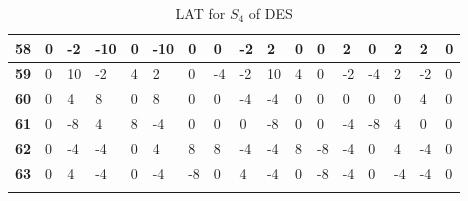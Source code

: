 \begin{longtable}[c]{|l|l|l|l|l|l|l|l|l|l|l|l|l|l|l|l|l|}
\textbf{58} & 0          & -2         & -10        & 0          & -10        & 0          & 0          & -2         & 2          & 0          & 0           & 2           & 0           & 2           & 2           & 0           \\ \hline
\textbf{59} & 0          & 10         & -2         & 4          & 2          & 0          & -4         & -2         & 10         & 4          & 0           & -2          & -4          & 2           & -2          & 0           \\ \hline
\textbf{60} & 0          & 4          & 8          & 0          & 8          & 0          & 0          & -4         & -4         & 0          & 0           & 0           & 0           & 0           & 4           & 0           \\ \hline
\textbf{61} & 0          & -8         & 4          & 8          & -4         & 0          & 0          & 0          & -8         & 0          & 0           & -4          & -8          & 4           & 0           & 0           \\ \hline
\textbf{62} & 0          & -4         & -4         & 0          & 4          & 8          & 8          & -4         & -4         & 8          & -8          & -4          & 0           & 4           & -4          & 0           \\ \hline
\textbf{63} & 0          & 4          & -4         & 0          & -4         & -8         & 0          & 4          & -4         & 0          & -8          & -4          & 0           & -4          & -4          & 0           \\ \hline
\caption{LAT for $S_4$ of DES}
\label{tbl:lat4}
\end{longtable}